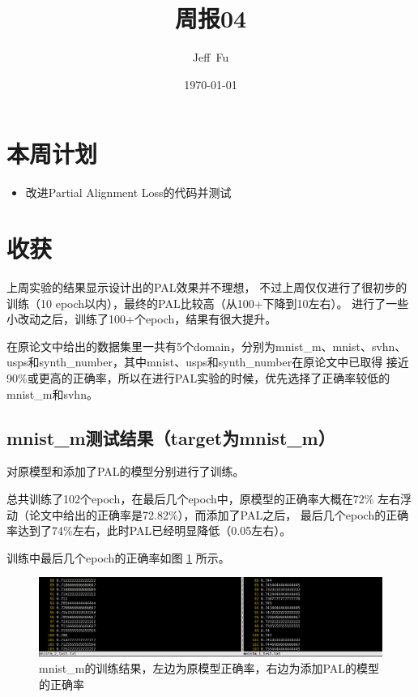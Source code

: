 \documentclass[UTF8]{ctexart}
\title{周报04}
\author{Jeff\ Fu}
\date{\today}
\begin{document}
    \maketitle
    \section{本周计划}
        \begin{itemize}
            \item 改进Partial Alignment Loss的代码并测试
        \end{itemize}
    \section{收获}
        上周实验的结果显示设计出的PAL效果并不理想，
        不过上周仅仅进行了很初步的训练（10 epoch以内），最终的PAL比较高（从100+下降到10左右）。
        进行了一些小改动之后，训练了100+个epoch，结果有很大提升。

        在原论文中给出的数据集里一共有5个domain，分别为mnist\_m、mnist、svhn、
        usps和synth\_number，其中mnist、usps和synth\_number在原论文中已取得
        接近90\%或更高的正确率，所以在进行PAL实验的时候，优先选择了正确率较低的
        mnist\_m和svhn。
        \subsection{mnist\_m测试结果（target为mnist\_m）}
            对原模型和添加了PAL的模型分别进行了训练。

            总共训练了102个epoch，在最后几个epoch中，原模型的正确率大概在72\%
            左右浮动（论文中给出的正确率是72.82\%），而添加了PAL之后，
            最后几个epoch的正确率达到了74\%左右，此时PAL已经明显降低（0.05左右）。

            训练中最后几个epoch的正确率如图 \ref{fig:mnistm} 所示。
            \begin{figure}[ht]
                \centering
                \includegraphics[scale=0.35]{Week04_mnistm.png}
                \caption{mnist\_m的训练结果，左边为原模型正确率，右边为添加PAL的模型的正确率}
                \label{fig:mnistm}
            \end{figure}
\end{document}
